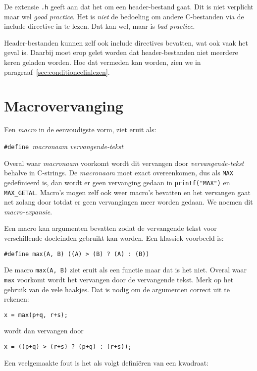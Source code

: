 De extensie \texttt{.h} geeft aan dat het om een header-bestand gaat. Dit is niet verplicht maar wel \textsl{good practice}. Het is \textsl{niet} de bedoeling om andere C-bestanden via de include directive in te lezen. Dat kan wel, maar is \textsl{bad practice}.

Header-bestanden kunnen zelf ook include directives bevatten, wat ook vaak het geval is. Daarbij moet erop gelet  worden dat header-bestanden niet meerdere keren geladen worden. Hoe dat vermeden kan worden, zien we in paragraaf~\ref{sec:conditioneelinlezen}.


\section{Macrovervanging}
Een \textsl{macro} in de eenvoudigste vorm, ziet eruit als:

\hspace*{1em}\texttt{\#define }\textsl{macronaam vervangende-tekst}

Overal waar \textsl{macronaam} voorkomt wordt dit vervangen door \textsl{vervangende-tekst} behalve in C-strings. De \textsl{macronaam} moet exact overeenkomen, dus als \texttt{MAX} gedefinieerd is, dan wordt er geen vervanging gedaan in \texttt{printf("{}MAX")} en \texttt{MAX\_GETAL}. Macro's mogen zelf ook weer macro's bevatten en het vervangen gaat net zolang door totdat er geen vervangingen meer worden gedaan. We noemen dit \textsl{macro-expansie}.

Een macro kan argumenten bevatten zodat de vervangende tekst voor verschillende doeleinden gebruikt kan worden. Een klassiek voorbeeld is:

\hspace*{1em}\texttt{\#define max(A, B) ((A) > (B) ? (A) : (B))}

De macro \texttt{max(A, B)} ziet eruit als een functie maar dat is het niet. Overal waar \texttt{max} voorkomt wordt het vervangen door de vervangende tekst. Merk op het gebruik van de vele haakjes. Dat is nodig om de argumenten correct uit te rekenen:

\hspace*{1em}\texttt{x = max(p+q, r+s);}

wordt dan vervangen door

\hspace*{1em}\texttt{x = ((p+q) > (r+s) ? (p+q) : (r+s));}

Een veelgemaakte fout is het als volgt definiëren van een kwadraat:


